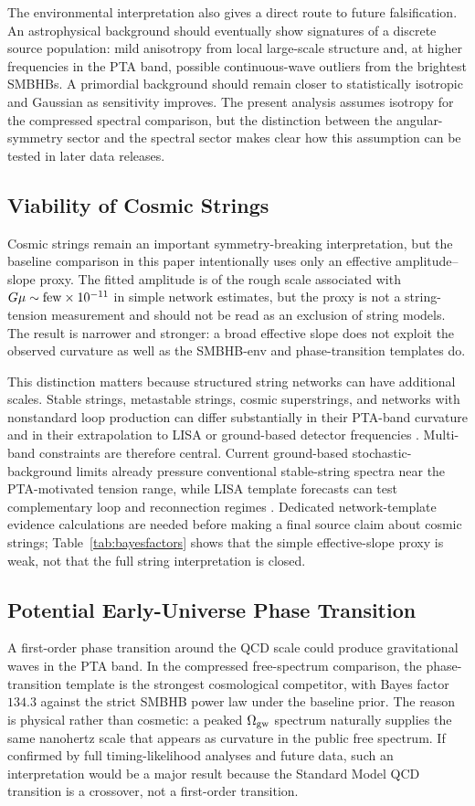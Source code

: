 \documentclass[symmetry,article,submit,pdftex,moreauthors]{Definitions/mdpi}
\begin{document}
The environmental interpretation also gives a direct route to future falsification. An astrophysical background should eventually show signatures of a discrete source population: mild anisotropy from local large-scale structure and, at higher frequencies in the PTA band, possible continuous-wave outliers from the brightest SMBHBs. A primordial background should remain closer to statistically isotropic and Gaussian as sensitivity improves. The present analysis assumes isotropy for the compressed spectral comparison, but the distinction between the angular-symmetry sector and the spectral sector makes clear how this assumption can be tested in later data releases.

\subsection{Viability of Cosmic Strings}
Cosmic strings remain an important symmetry-breaking interpretation, but the baseline comparison in this paper intentionally uses only an effective amplitude--slope proxy. The fitted amplitude is of the rough scale associated with $G\mu\sim{\rm few}\times10^{-11}$ in simple network estimates, but the proxy is not a string-tension measurement and should not be read as an exclusion of string models. The result is narrower and stronger: a broad effective slope does not exploit the observed curvature as well as the SMBHB-env and phase-transition templates do.

This distinction matters because structured string networks can have additional scales. Stable strings, metastable strings, cosmic superstrings, and networks with nonstandard loop production can differ substantially in their PTA-band curvature and in their extrapolation to LISA or ground-based detector frequencies \cite{Ellis2023}. Multi-band constraints are therefore central. Current ground-based stochastic-background limits already pressure conventional stable-string spectra near the PTA-motivated tension range, while LISA template forecasts can test complementary loop and reconnection regimes \cite{BlancoPillado2025LISAStrings}. Dedicated network-template evidence calculations are needed before making a final source claim about cosmic strings; Table~\ref{tab:bayesfactors} shows that the simple effective-slope proxy is weak, not that the full string interpretation is closed.

\subsection{Potential Early-Universe Phase Transition}
A first-order phase transition around the QCD scale could produce gravitational waves in the PTA band. In the compressed free-spectrum comparison, the phase-transition template is the strongest cosmological competitor, with Bayes factor $134.3$ against the strict SMBHB power law under the baseline prior. The reason is physical rather than cosmetic: a peaked $\Omega_{\rm gw}$ spectrum naturally supplies the same nanohertz scale that appears as curvature in the public free spectrum. If confirmed by full timing-likelihood analyses and future data, such an interpretation would be a major result because the Standard Model QCD transition is a crossover, not a first-order transition.
\end{document}
